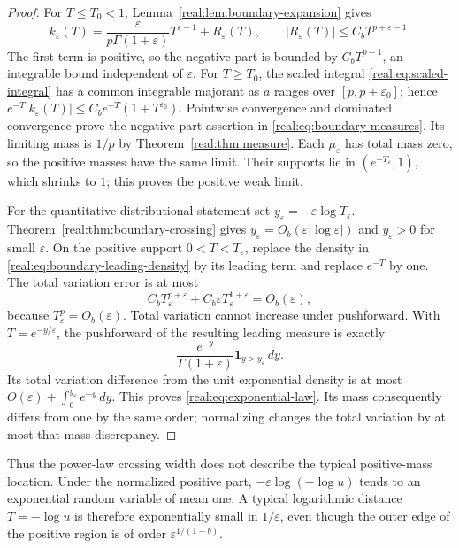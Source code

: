 \begin{proof}
For $T\leq T_0<1$, Lemma~\ref{real:lem:boundary-expansion} gives
\begin{equation}\label{real:eq:boundary-leading-density}
 k_\varepsilon(T)=
 \frac{\varepsilon}{p\Gamma(1+\varepsilon)}T^{\varepsilon-1}
       +R_\varepsilon(T),\qquad
 |R_\varepsilon(T)|\leq C_bT^{p+\varepsilon-1}.
\end{equation}
The first term is positive, so the negative part is bounded by
$C_bT^{p-1}$, an integrable bound independent of $\varepsilon$.
For $T\geq T_0$, the scaled integral
\eqref{real:eq:scaled-integral} has a common integrable majorant as
$a$ ranges over $[p,p+\varepsilon_0]$; hence
$e^{-T}|k_\varepsilon(T)|\leq
C_be^{-T}(1+T^{\varepsilon_0})$. Pointwise convergence and dominated
convergence prove the negative-part assertion in
\eqref{real:eq:boundary-measures}. Its limiting mass is $1/p$ by
Theorem~\ref{real:thm:measure}. Each $\mu_\varepsilon$ has total
mass zero, so the positive masses have the same limit. Their supports
lie in $(e^{-T_\varepsilon},1)$, which shrinks to $1$; this proves
the positive weak limit.

For the quantitative distributional statement set
$y_\varepsilon=-\varepsilon\log T_\varepsilon$.
Theorem~\ref{real:thm:boundary-crossing} gives
$y_\varepsilon=O_b(\varepsilon|\log\varepsilon|)$ and
$y_\varepsilon>0$ for small $\varepsilon$.
On the positive support $0<T<T_\varepsilon$, replace the density
in \eqref{real:eq:boundary-leading-density} by its leading term
and replace $e^{-T}$ by one. The total variation error is at most
\[
 C_bT_\varepsilon^{p+\varepsilon}
     +C_b\varepsilon T_\varepsilon^{1+\varepsilon}
 =O_b(\varepsilon),
\]
because $T_\varepsilon^p=O_b(\varepsilon)$.
Total variation cannot increase under pushforward. With
$T=e^{-y/\varepsilon}$, the pushforward of the resulting leading
measure is exactly
\[
 \frac{e^{-y}}{\Gamma(1+\varepsilon)}
          \mathbf1_{y>y_\varepsilon}\,dy.
\]
Its total variation difference from the unit exponential density
is at most
$O(\varepsilon)+\int_0^{y_\varepsilon}e^{-y}\,dy$.
This proves \eqref{real:eq:exponential-law}. Its mass consequently
differs from one by the same order; normalizing changes the total
variation by at most that mass discrepancy.
\end{proof}

Thus the power-law crossing width does not describe the typical
positive-mass location. Under the normalized positive part,
$-\varepsilon\log(-\log u)$ tends to an exponential random variable
of mean one. A typical logarithmic distance $T=-\log u$ is therefore
exponentially small in $1/\varepsilon$, even though the outer edge of
the positive region is of order $\varepsilon^{1/(1-b)}$.

